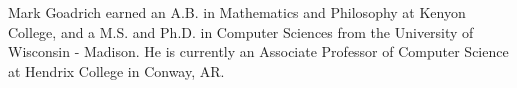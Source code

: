 \documentclass[journal]{IEEEtran}
\begin{document}




\ifCLASSOPTIONcaptionsoff
  \newpage
\fi







%
% 

\begin{IEEEbiography}{Mark Goadrich} earned an A.B. in Mathematics and Philosophy at Kenyon College, and a M.S. and Ph.D. in Computer Sciences from the University of Wisconsin - Madison.
He is currently an Associate Professor of Computer Science at Hendrix College in Conway, AR.
\end{IEEEbiography}
\end{document}
